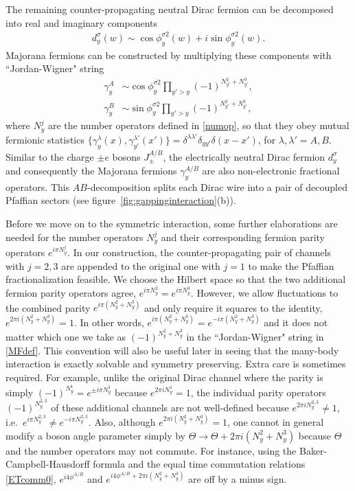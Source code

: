 The remaining counter-propagating neutral Dirac fermion can be decomposed into real and imaginary components \begin{align}d_y^{\sigma}(w)\sim\cos\phi^{\sigma2}_y(w)+i\sin\phi^{\sigma2}_y(w).\end{align} Majorana fermions can be constructed by multiplying these components with ``Jordan-Wigner" string \begin{align}\gamma^A_y&\sim\cos\phi^{\sigma2}_y\prod_{y'>y}(-1)^{N_{y'}^2+N_{y'}^3},\nonumber\\\gamma^B_y&\sim\sin\phi^{\sigma2}_y\prod_{y'>y}(-1)^{N_{y'}^2+N_{y'}^3},\label{MFdef}\end{align} where $N^j_y$ are the number operators defined in \eqref{numop}, so that they obey mutual fermionic statistics $\{\gamma^\lambda_y(x),\gamma^{\lambda'}_{y'}(x')\}=\delta^{\lambda\lambda'}\delta_{yy'}\delta(x-x')$, for $\lambda,\lambda'=A,B$. Similar to the charge  $\pm e$ bosons $J^{A/B}_\pm$, the electrically neutral Dirac fermion $d_y^\sigma$ and consequently the Majorana fermions $\gamma^{A/B}_y$ are also non-electronic fractional operators. This $AB$-decomposition splits each Dirac wire into a pair of decoupled Pfaffian sectors (see figure~\ref{fig:gappinginteraction}(b)).

Before we move on to the symmetric interaction, some further elaborations are needed for the number operators $N_y^j$ and their corresponding fermion parity operators $e^{i\pi N_y^j}$. In our construction, the counter-propagating pair of channels with $j=2,3$ are appended to the original one with $j=1$ to make the Pfaffian fractionalization feasible. We choose the Hilbert space so that the two additional fermion parity operators agree, $e^{i\pi N_y^2}=e^{i\pi N_y^3}$. However, we allow fluctuations to the combined parity $e^{i\pi(N_y^2+N_y^3)}$ and only require it squares to the identity, $e^{2\pi i(N_y^2+N_y^3)}=1$. In other words, $e^{i\pi(N_y^2+N_y^3)}=e^{-i\pi(N_y^2+N_y^3)}$ and it does not matter which one we take as $(-1)^{N_y^2+N_y^3}$ in the ``Jordan-Wigner" string in \eqref{MFdef}. This convention will also be useful later in seeing that the many-body interaction is exactly solvable and symmetry preserving. Extra care is sometimes required. For example, unlike the original Dirac channel where the parity is simply $(-1)^{N_y^1}=e^{\pm i\pi N_y^1}$ because $e^{2\pi iN_y^1}=1$, the individual parity operators $(-1)^{N_y^{2,3}}$ of these additional channels are not well-defined because $e^{2\pi iN_y^{2,3}}\neq1$, i.e.~$e^{i\pi N_y^{2,3}}\neq e^{-i\pi N_y^{2,3}}$. Also, although $e^{2\pi i(N_y^2+N_y^3)}=1$, one cannot in general modify a boson angle parameter simply by $\Theta\to\Theta+2\pi i(N_y^2+N_y^3)$ because $\Theta$ and the number operators may not commute. For instance, using the Baker-Campbell-Hausdorff formula and the equal time commutation relations \eqref{ETcomm0}, $e^{i4\phi^{A/B}}$ and $e^{i4\phi^{A/B}+2\pi i(N_y^2+N_y^3)}$ are off by a minus sign.

